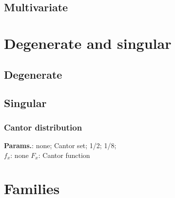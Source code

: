             
    

        
            \subsection{Multivariate}

            
    

        

        
    


    \section{Degenerate  and singular}
        
            \subsection{Degenerate}

            
    

        
            \subsection{Singular}

            
    
        
\subsubsection{Cantor distribution}





    {\color{darkblue} \textbf{Params.}:} {none}; {Cantor set}; {1/2}; {1/8};\hspace{0.5cm}\\{\color{darkblue} \textbf{$f_x$}:} {none}{\color{darkblue} \textbf{$F_x$}:} {Cantor function}



    

        

        
    


    \section{Families}
        

        
    

